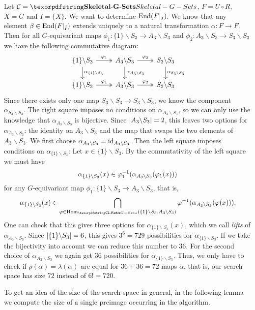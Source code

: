 \begin{exmp}\label{exmp:idea_behind_lifting_maps}
Let $\Ccal = \SkeletalGSets$, $F = U \circ R$, $X = G$ and $I = \{X\}$. We want to determine $\operatorname{End}(F\vert_{\tilde I})$. We know that any element $\beta \in \operatorname{End}(F\vert_{\tilde I})$ extends uniquely to a natural transformation $\alpha\colon F \to F$. Then for all $G$-equivariant maps $\phi_1\colon \{1\} \backslash S_3 \to A_3 \backslash S_3$ and $\phi_2\colon A_3 \backslash S_3 \to S_3 \backslash S_3$ we have the following commutative diagram:
\[
\begin{tikzcd}
\{1\} \backslash S_3 \arrow[d, "\alpha_{\{1\} \backslash S_3}"] \arrow[r, "\phi_1", two heads] & A_3 \backslash S_3 \arrow[d, "\alpha_{A_3 \backslash S_3}"] \arrow[r, "\phi_2", two heads] & S_3 \backslash S_3 \arrow[d, "\alpha_{S_3 \backslash S_3}"] \\
\{1\} \backslash S_3 \arrow[r, "\phi_1", two heads]                                            & A_3 \backslash S_3 \arrow[r, "\phi_2", two heads]                                          & S_3 \backslash S_3                                         
\end{tikzcd}
\]
Since there exists only one map $S_3 \backslash S_3 \to S_3 \backslash S_3$, we know the component $\alpha_{S_3 \backslash S_3}$. The right square imposes no conditions on $\alpha_{A_3 \backslash S_3}$, so we can only use the knowledge that $\alpha_{A_3 \backslash S_3}$ is bijective. Since ${\lvert A_3 \backslash S_3\rvert} = 2$, this leaves two options for $\alpha_{A_3 \backslash S_3}$: the identity on $A_3 \backslash S_3$ and the map that swaps the two elements of $A_3 \backslash S_3$. We first choose $\alpha_{A_3 \backslash S_3} = \operatorname{id}_{A_3 \backslash S_3}$. Then the left square imposes conditions on $\alpha_{\{1\} \backslash S_3}$: Let $x \in \{1\} \backslash S_3$. By the commutativity of the left square we must have \[\alpha_{\{1\} \backslash S_3}(x) \in \varphi_1^{-1}(\alpha_{A_3 \backslash S_3}(\varphi_1(x)))\] for any $G$-equivariant map $\phi_1\colon \{1\} \backslash S_3 \to A_3 \backslash S_3$, that is, \[\alpha_{\{1\} \backslash S_3}(x) \in \bigcap_{\phi \in \Hom_\Gset(\{1\} \backslash S_3,A_3 \backslash S_3)}\phi\inv(\alpha_{A_3 \backslash S_3}(\phi(x))).\] One can check that this gives three options for $\alpha_{\{1\} \backslash S_3}(x)$, which we call \emph{lifts} of $\alpha_{A_3 \backslash S_3}$. Since ${\lvert\{1\} \backslash S_3\rvert} = 6$, this gives $3^6 = 729$ possibilities for $\alpha_{\{1\} \backslash S_3}$. If we take the bijectivity into account we can reduce this number to $36$. For the second choice of $\alpha_{A_3 \backslash S_3}$ we again get $36$ possibilities for $\alpha_{\{1\} \backslash S_3}$. Thus, we only have to check if $\rho(\alpha) = \lambda(\alpha)$ are equal for $36 + 36 = 72$ maps $\alpha$, that is, our search space has size $72$ instead of $6! = 720$.

To get an idea of the size of the search space in general, in the following lemma we compute the size of a single preimage occurring in the algorithm.
\end{exmp}

